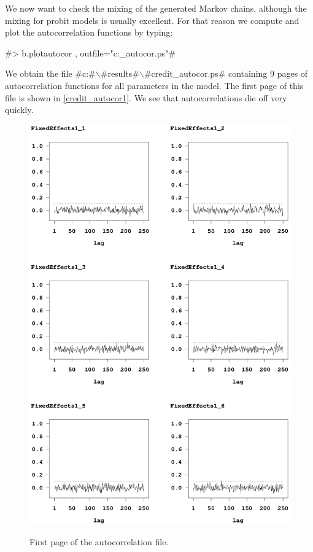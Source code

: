 We now want to check the mixing of the generated Markov chains,
although the mixing for probit models is usually excellent. For
that reason we compute and plot the autocorrelation functions by
typing:

#> b.plotautocor , outfile="c:\results\credit_autocor.ps"#

We obtain the file
#c:#$\backslash$#results#$\backslash$#credit_autocor.ps# containing 9
pages of autocorrelation functions for all parameters in the
model. The first page of this file is shown in
\autoref{credit_autocor1}. We see that autocorrelations die off
very quickly.

\begin{figure}[ht]
\vspace{0.5cm}
\begin{center}
\includegraphics[scale=0.8]{grafiken/credit_autocor1.ps}
\end{center}
{\em\caption{ \label{credit_autocor1} First page of the
autocorrelation file.}}
\end{figure}

